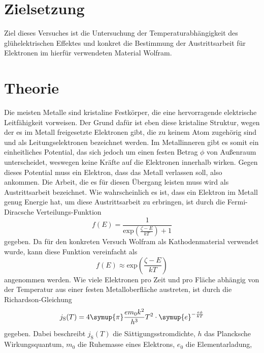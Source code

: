 \section{Zielsetzung}
Ziel dieses Versuches ist die Untersuchung der Temperaturabhängigkeit des glühelektrischen Effektes und konkret die Bestimmung der Austrittsarbeit für Elektronen im
hierfür verwendeten Material Wolfram.

\section{Theorie}
\label{sec:Theorie}

Die meisten Metalle sind kristaline Festkörper, die eine hervorragende elektrische Leitfähigkeit vorweisen. Der Grund dafür ist eben diese kristaline Struktur, wegen
der es im Metall freigesetzte Elektronen gibt, die zu keinem Atom zugehörig sind und als Leitungselektronen bezeichnet werden. Im Metallinneren gibt es somit ein
einheitliches Potential, das sich jedoch um einen festen Betrag $\phi$ von Außenraum unterscheidet, weswegen keine Kräfte auf die Elektronen innerhalb wirken.
\newline
Gegen dieses Potential muss ein Elektron, dass das Metall verlassen soll, also ankommen. Die Arbeit, die es für diesen Übergang leisten muss wird als Austrittsarbeit
bezeichnet. Wie wahrscheinlich es ist, dass ein Elektron im Metall genug Energie hat, um diese Austrittsarbeit zu erbringen, ist durch die Fermi-Diracsche
Verteilungs-Funktion 
\begin{equation}
    \label{eqn:Fermi_Dirac}
    f(E) = \frac{1}{\mathrm{exp}\left( \frac{\zeta - E}{kT} \right) + 1}
\end{equation}
gegeben. Da für den konkreten Versuch Wolfram als Kathodenmaterial verwendet wurde, kann diese Funktion vereinfacht als
\begin{equation}
    \label{eqn:Fermi_Dirac}
    f(E) \approx \mathrm{exp}\left( \frac{\zeta - E}{kT} \right)
\end{equation}
angenommen werden.
\noindent
Wie viele Elektronen pro Zeit und pro Fläche abhängig von der Temperatur aus einer festen Metalloberfläche austreten, ist durch die Richardson-Gleichung 
\begin{equation}
    j_\text{S}(T) = 4 \symup{\pi}\frac{e m_0 k^2}{h^3}T^2 \cdot \symup{e}^{-\frac{e\phi}{kT}}
    \label{eqn:J_S}
\end{equation}
gegeben. Dabei beschreibt $j_\text{S}(T)$ die Sättigungsstromdichte, $h$ das Plancksche Wirkungsquantum, $m_0$ die Ruhemasse eines Elektrons, $e_0$ die Elementarladung,
